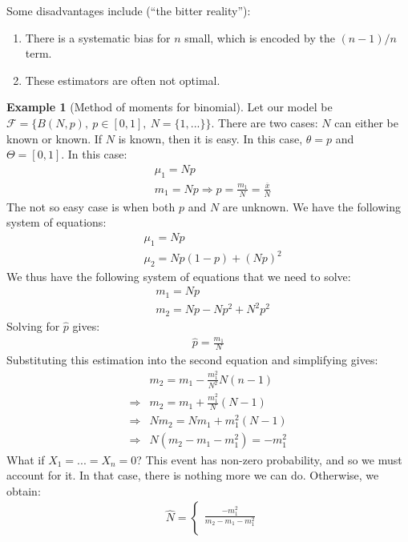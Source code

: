 \documentclass[11pt]{scrartcl}
\theoremstyle{definition}
\newtheorem{ex}{Example}
\theoremstyle{remark}
\newcommand{\dist}[0]{\mathcal{F}}
\begin{document}
{Some disadvantages include (``the bitter reality''): 
	\begin{enumerate}[noitemsep]
		\item There is a systematic bias for $n$ small, which is encoded by the $(n-1)/n$ term. 
		\item These estimators are often not optimal. 
	\end{enumerate}
	

\begin{ex}[Method of moments for binomial] 
	Let our model be $\dist = \{ B(N,p),\ p \in [0,1],\ N=\{ 1,... \} \} $. There are two cases: $N$ can either be known or known. If $N$ is known, then it is easy. In this case, $\theta = p$ and $\Theta = [0,1]$. In this case: 
	\begin{align*}
		& \mu_1 = Np \\
		& m_1 = Np \Rightarrow \hat{p} = \frac{m_1}{N}	 = \frac{\overline{x}}{N}
	\end{align*}
	The not so easy case is when both $p$ and $N$ are unknown. We have the following system of equations: 
	\begin{align*}
		& \mu_1 = Np 	\\
		& \mu_2 = Np(1-p) + (Np)^2 
	\end{align*}
	We thus have the following system of equations that we need to solve: 
	\begin{align*}
		& m_1 = Np \\	
		& m_2 = Np - Np^2  + N^2p^2 
	\end{align*}
	Solving for $\hat{p}$ gives: 
	\begin{align*}
		\hat{p} = \frac{m_1}{N}	
	\end{align*}
	Substituting this estimation into the second equation and simplifying gives: 
	\begin{align*}
		& m_2 = m_1 - \frac{m_1^2}{N^2} N(n-1) \\
		 \Rightarrow &  m_2 	= m_1 + \frac{m_1^2}{N} (N-1) \\
		 \Rightarrow & Nm_2 = Nm_1 + m_1^2 (N-1) \\
		 \Rightarrow & N(m_2 - m_1 - m_1^2) = -m_1^2 
	\end{align*}
	What if $X_1 = ... = X_n = 0$? This event has non-zero probability, and so we must account for it. In that case, there is nothing more we can do. Otherwise, we obtain: 
	\begin{align*}
		& \hat{N} = \begin{cases}
				\frac{-m_1^2}{m_2 - m_1 - m_1^2} \\

\end{cases}
\end{align*}
\end{ex}}
\end{document}
